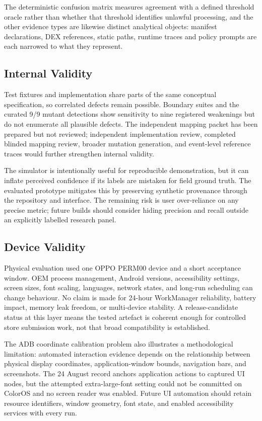 The deterministic confusion matrix measures agreement with a defined threshold oracle rather than whether that threshold identifies unlawful processing, and the other evidence types are likewise distinct analytical objects: manifest declarations, DEX references, static paths, runtime traces and policy prompts are each narrowed to what they represent.

\subsection{Internal Validity}

Test fixtures and implementation share parts of the same conceptual specification, so correlated defects remain possible. Boundary suites and the curated 9/9 mutant detections show sensitivity to nine registered weakenings but do not enumerate all plausible defects. The independent mapping packet has been prepared but not reviewed; independent implementation review, completed blinded mapping review, broader mutation generation, and event-level reference traces would further strengthen internal validity.

The simulator is intentionally useful for reproducible demonstration, but it can inflate perceived confidence if its labels are mistaken for field ground truth. The evaluated prototype mitigates this by preserving synthetic provenance through the repository and interface. The remaining risk is user over-reliance on any precise metric; future builds should consider hiding precision and recall outside an explicitly labelled research panel.

\subsection{Device Validity}

Physical evaluation used one OPPO PERM00 device and a short acceptance window. OEM process management, Android versions, accessibility settings, screen sizes, font scaling, languages, network states, and long-run scheduling can change behaviour. No claim is made for 24-hour WorkManager reliability, battery impact, memory leak freedom, or multi-device stability. A release-candidate status at this layer means the tested artefact is coherent enough for controlled store submission work, not that broad compatibility is established.

The ADB coordinate calibration problem also illustrates a methodological limitation: automated interaction evidence depends on the relationship between physical display coordinates, application-window bounds, navigation bars, and screenshots. The 24 August record anchors application actions to captured UI nodes, but the attempted extra-large-font setting could not be committed on ColorOS and no screen reader was enabled. Future UI automation should retain resource identifiers, window geometry, font state, and enabled accessibility services with every run.

